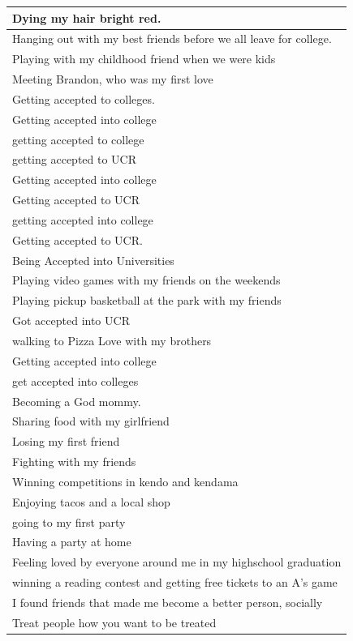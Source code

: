 \documentclass[
  .7em,
  letterpaper,
  DIV=11,
  numbers=noendperiod]{scrartcl}
\begin{document}
\begin{table}
\begin{tabular}{l}
\hline
Dying my hair bright red.\\
\hline
Hanging out with my best friends before we all leave for college.\\
\hline
Playing with my childhood friend when we were kids\\
\hline
Meeting Brandon, who was my first love\\
\hline
Getting accepted to colleges.\\
\hline
Getting accepted into college\\
\hline
getting accepted to college\\
\hline
getting accepted to UCR\\
\hline
Getting accepted into college\\
\hline
Getting accepted to UCR\\
\hline
getting accepted into college\\
\hline
Getting accepted to UCR.\\
\hline
Being Accepted into Universities\\
\hline
Playing video games with my friends on the weekends\\
\hline
Playing pickup basketball at the park with my friends\\
\hline
Got accepted into UCR\\
\hline
walking to Pizza Love with my brothers\\
\hline
Getting accepted into college\\
\hline
get accepted into colleges\\
\hline
Becoming a God mommy.\\
\hline
Sharing food with my girlfriend\\
\hline
Losing my first friend\\
\hline
Fighting with my friends\\
\hline
Winning competitions in kendo and kendama\\
\hline
Enjoying tacos and a local shop\\
\hline
going to my first party\\
\hline
Having a party at home\\
\hline
Feeling loved by everyone around me in my highschool graduation\\
\hline
winning a reading contest and getting free tickets to an A's game\\
\hline
I found friends that made me become a better person, socially\\
\hline
Treat people how you want to be treated\\

\end{tabular}
\end{table}
\end{document}
